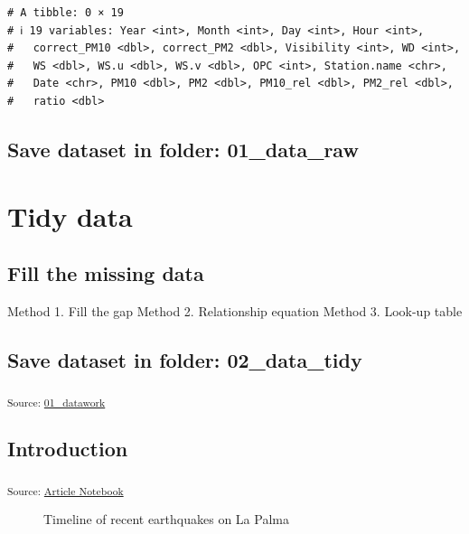 \documentclass[
]{agujournal2019}
\begin{document}
\begin{verbatim}
# A tibble: 0 × 19
# ℹ 19 variables: Year <int>, Month <int>, Day <int>, Hour <int>,
#   correct_PM10 <dbl>, correct_PM2 <dbl>, Visibility <int>, WD <int>,
#   WS <dbl>, WS.u <dbl>, WS.v <dbl>, OPC <int>, Station.name <chr>,
#   Date <chr>, PM10 <dbl>, PM2 <dbl>, PM10_rel <dbl>, PM2_rel <dbl>,
#   ratio <dbl>
\end{verbatim}

\subsection{Save dataset in folder:
01\_data\_raw}\label{save-dataset-in-folder-01_data_raw}

\section{Tidy data}\label{tidy-data}

\subsection{Fill the missing data}\label{fill-the-missing-data}

Method 1. Fill the gap Method 2. Relationship equation Method 3. Look-up
table

\subsection{Save dataset in folder:
02\_data\_tidy}\label{save-dataset-in-folder-02_data_tidy}

\textsubscript{Source:
\href{https://EmouAcademy.github.io/my-awesome-manuscripts/notebooks/01_datawork-preview.html\#c335df36-7197-45eb-a1d9-0a90e5099ce8}{01\_datawork}}

\subsection{Introduction}\label{introduction}

\textsubscript{Source:
\href{https://EmouAcademy.github.io/my-awesome-manuscripts/index.qmd.html}{Article
Notebook}}

\label{cell-fig-timeline}
\begin{figure}[H]


\caption{\label{fig-timeline}Timeline of recent earthquakes on La Palma}

\end{figure}%
\end{document}
